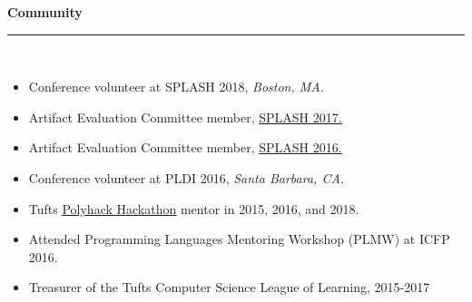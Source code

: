 {\large\bf Community}\\[-.3cm]
\rule{\linewidth}{.5pt}\\[.2cm]
\begin{minipage}{\linewidth}
\begin{itemize}[leftmargin=.5cm]
  \item Conference volunteer at SPLASH 2018, {\it Boston, MA.}
  \item Artifact Evaluation Committee member, \underline{\href{https://2017.splashcon.org/committee/splash-2017-oopsla-artifacts-artifact-evaluation-committee}{SPLASH 2017.}}
  \item Artifact Evaluation Committee member, \underline{\href{https://2016.splashcon.org/committee/splash-2016-artifacts-organizing-committee}{SPLASH 2016.}}
  \item Conference volunteer at PLDI 2016, {\it Santa Barbara, CA.}
  \item Tufts \underline{\href{http://2018.polyhack.tufts.io}{Polyhack Hackathon}}
				mentor in 2015, 2016, and 2018.
  \item Attended Programming Languages Mentoring Workshop (PLMW) at ICFP 2016.
  \item Treasurer of the Tufts Computer Science League of Learning, 2015-2017
\end{itemize}

\end{minipage}






